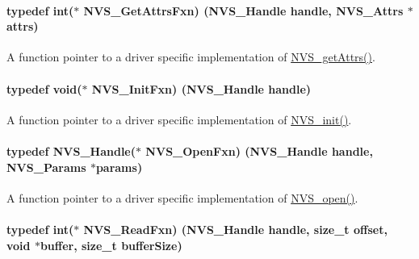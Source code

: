 \paragraph[{N\+V\+S\+\_\+\+Get\+Attrs\+Fxn}]{\setlength{\rightskip}{0pt plus 5cm}typedef int($\ast$ N\+V\+S\+\_\+\+Get\+Attrs\+Fxn) ({\bf N\+V\+S\+\_\+\+Handle} handle, {\bf N\+V\+S\+\_\+\+Attrs} $\ast$attrs)}\label{_n_v_s_8h_a6f07b7dcd80b867b79f84152c449f059}


A function pointer to a driver specific implementation of \hyperlink{_n_v_s_8h_a6b92f45097f377824524f7a4f33f02b1}{N\+V\+S\+\_\+get\+Attrs()}. 

\paragraph[{N\+V\+S\+\_\+\+Init\+Fxn}]{\setlength{\rightskip}{0pt plus 5cm}typedef void($\ast$ N\+V\+S\+\_\+\+Init\+Fxn) ({\bf N\+V\+S\+\_\+\+Handle} handle)}\label{_n_v_s_8h_ad2e24ef1cb8bad08b75bc36c6a9cc36d}


A function pointer to a driver specific implementation of \hyperlink{_n_v_s_8h_a94e249f718eba502cdf34d098c83209e}{N\+V\+S\+\_\+init()}. 

\paragraph[{N\+V\+S\+\_\+\+Open\+Fxn}]{\setlength{\rightskip}{0pt plus 5cm}typedef {\bf N\+V\+S\+\_\+\+Handle}($\ast$ N\+V\+S\+\_\+\+Open\+Fxn) ({\bf N\+V\+S\+\_\+\+Handle} handle, {\bf N\+V\+S\+\_\+\+Params} $\ast$params)}\label{_n_v_s_8h_ad4be882e6ffecd7d54c3daa02a41752b}


A function pointer to a driver specific implementation of \hyperlink{_n_v_s_8h_ad3a3d1f1477312eeee6d2c907a25bd67}{N\+V\+S\+\_\+open()}. 

\paragraph[{N\+V\+S\+\_\+\+Read\+Fxn}]{\setlength{\rightskip}{0pt plus 5cm}typedef int($\ast$ N\+V\+S\+\_\+\+Read\+Fxn) ({\bf N\+V\+S\+\_\+\+Handle} handle, size\+\_\+t offset, void $\ast$buffer, size\+\_\+t buffer\+Size)}\label{_n_v_s_8h_ac5f94f84441e53eecbb1e3e6af41f019}


